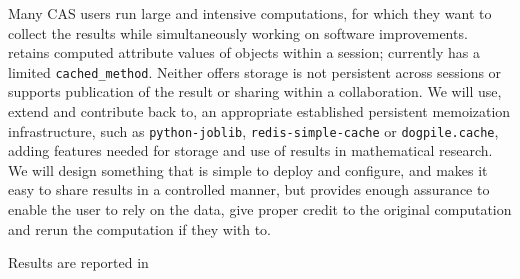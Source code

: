 \begin{workpackage}[id=dksbases,%
  title=Data/Knowledge/Software-Bases,lead=JU,
  ZHRM=12,JURM=36,UWRM=25,SARM=10,LLRM=2,PSRM=4]
\begin{tasklist}
\begin{task}[title=Memoization and production of new data,id=data-memo,
  lead=SA,partners={US,PS,UW},PM=12,wphases=24-42!.6]
  Many CAS users run large and intensive computations, for which they want to collect the
  results while simultaneously working on software improvements. \GAP retains computed
  attribute values of objects within a session; \Sage currently has a limited
  \lstinline{cached_method}. Neither offers storage is not persistent across sessions or
  supports publication of the result or sharing within a collaboration. We will use,
  extend and contribute back to, an appropriate established persistent memoization
  infrastructure, such as \texttt{python-joblib}, \texttt{redis-simple-cache} or
  \texttt{dogpile.cache}, adding features needed for storage and use of results in
  mathematical research. We will design something that is simple to deploy and configure,
  and makes it easy to share results in a controlled manner, but provides enough assurance
  to enable the user to rely on the data, give proper credit to the original computation
  and rerun the computation if they with to.

  Results are reported in 

\end{task}
\end{tasklist}


\end{workpackage}
